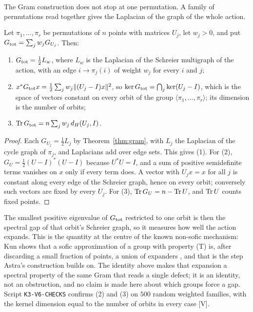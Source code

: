 \documentclass[11pt]{article}
\theoremstyle{remark}\newtheorem{remark}[theorem]{Remark}
\begin{document}
The Gram construction does not stop at one permutation. A family of permutations read together gives the Laplacian of the graph of the whole action.
\begin{proposition}\label{prop:schreier}
Let $\pi_1,\dots,\pi_r$ be permutations of $n$ points with matrices $U_j$, let $w_j>0$, and put $G_{\rm tot}=\sum_jw_jG_{U_j}$. Then:
\begin{enumerate}
\item $G_{\rm tot}=\tfrac12L_w$, where $L_w$ is the Laplacian of the Schreier multigraph of the action, with an edge $i\to\pi_j(i)$ of weight $w_j$ for every $i$ and $j$;
\item $x^*G_{\rm tot}x=\tfrac12\sum_jw_j\|(U_j-I)x\|^2$, so $\ker G_{\rm tot}=\bigcap_j\ker(U_j-I)$, which is the space of vectors constant on every orbit of the group $\langle\pi_1,\dots,\pi_r\rangle$; its dimension is the number of orbits;
\item $\operatorname{Tr} G_{\rm tot}=n\sum_jw_j\,d_H(U_j,I)$.
\end{enumerate}
\end{proposition}
\begin{proof}
Each $G_{U_j}=\tfrac12L_j$ by Theorem~\ref{thm:gram}, with $L_j$ the Laplacian of the cycle graph of $\pi_j$, and Laplacians add over edge sets. This gives (1). For (2), $G_U=\tfrac12(U-I)^*(U-I)$ because $U^*U=I$, and a sum of positive semidefinite terms vanishes on $x$ only if every term does. A vector with $U_jx=x$ for all $j$ is constant along every edge of the Schreier graph, hence on every orbit; conversely such vectors are fixed by every $U_j$. For (3), $\operatorname{Tr} G_U=n-\operatorname{Tr} U$, and $\operatorname{Tr} U$ counts fixed points.
\end{proof}
The smallest positive eigenvalue of $G_{\rm tot}$ restricted to one orbit is then the spectral gap of that orbit's Schreier graph, so it measures how well the action expands. This is the quantity at the centre of the known non-sofic mechanism: Kun shows that a sofic approximation of a group with property (T) is, after discarding a small fraction of points, a union of expanders \cite{Kun}, and that is the step Astra's construction builds on. The identity above makes that expansion a spectral property of the same Gram that reads a single defect; it is an identity, not an obstruction, and no claim is made here about which groups force a gap. Script \texttt{K3-V6-CHECKS} confirms (2) and (3) on $500$ random weighted families, with the kernel dimension equal to the number of orbits in every case [V].
\end{document}
